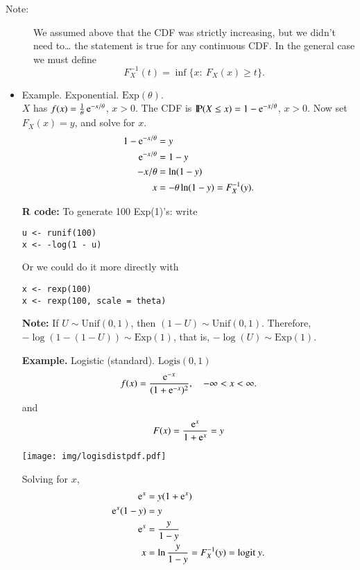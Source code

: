 \documentclass[captions=tableheading]{scrbook}
\begin{document}
\begin{description}
\item[Note:] We assumed above that the CDF was strictly increasing, but we didn't need to\ldots{} the statement is true for any continuous CDF. In the general case we must define 
  \[
  F_{X}^{-1}(t)=\inf\{x:\ F_{X}(x)\geq t\}.
  \]
\end{description}
\begin{itemize}

\item Example. Exponential. \(\mathrm{Exp}(\theta)\).\\
\label{sec-2_3_1_1}%
$X$ has $f(x)=\frac{1}{\theta}\, \mathrm{e}^{-x/\theta}$, $x > 0$.  The CDF is $\mathrm{I\hspace{-1.5pt}P}(X\leq x)=1 - \mathrm{e}^{-x/\theta}$, $x > 0$. Now set $F_{X}(x) = y$, and solve for $x$. 
\begin{align*}
1 - \mathrm{e}^{-x/\theta} & = y\\
\mathrm{e}^{-x/\theta} & = 1 - y\\
-x/\theta & = \ln(1-y)\\
x & = -\theta\ln(1-y) = F_{X}^{-1}(y).
\end{align*}

\textbf{R code:} To generate 100 Exp(1)'s: write
\begin{verbatim}
u <- runif(100)
x <- -log(1 - u)
\end{verbatim}

Or we could do it more directly with
\begin{verbatim}
x <- rexp(100)
x <- rexp(100, scale = theta)
\end{verbatim}


\textbf{Note:} If \(U\sim \mathrm{Unif}(0,1)\), then \( (1-U)\sim \mathrm{Unif}(0,1) \). Therefore, \(-\log(1-(1-U))\sim \mathrm{Exp}(1)\), that is, \(-\log(U)\sim \mathrm{Exp}(1)\).

\textbf{Example.} Logistic (standard). \( \mathrm{Logis}(0,1) \)
\[
f(x)=\frac{\mathrm{e}^{-x}}{(1 + \mathrm{e}^{-x})^{2}},\quad -\infty < x <\infty.
\]
and 
\[
F(x)=\frac{\mathrm{e}^{x}}{1 + \mathrm{e}^{x}} = y
\]
\begin{center}

\texttt{[image: img/logisdistpdf.pdf]}

\end{center}
Solving for $x$, 
\begin{align*}
\mathrm{e}^{x} & = y(1 + \mathrm{e}^{x})\\
\mathrm{e}^{x}(1-y) & = y\\
\mathrm{e}^{x} & = \frac{y}{1 - y} \\
x & = \ln \frac{y}{1 - y} = F_{X}^{-1}(y) = \mbox{logit}\ y.
\end{align*}


\end{itemize}
\end{document}
